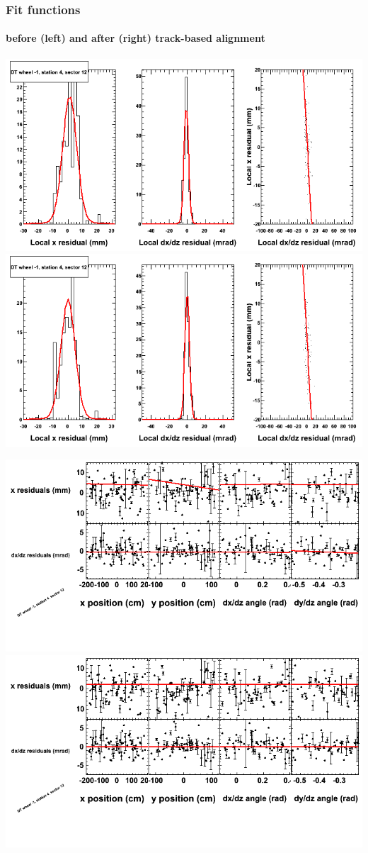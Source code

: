 \documentclass[compress]{beamer}
\begin{document}
\begin{frame}
\frametitle{Fit functions}
\framesubtitle{before (left) and after (right) track-based alignment}
\includegraphics[width=0.5\linewidth]{fitfunctions_re01/MBwhBst4sec12_bellcurves.png} \includegraphics[width=0.5\linewidth]{fitfunctions_re05/MBwhBst4sec12_bellcurves.png}

\includegraphics[width=0.5\linewidth]{fitfunctions_re01/MBwhBst4sec12_polynomials.png} \includegraphics[width=0.5\linewidth]{fitfunctions_re05/MBwhBst4sec12_polynomials.png}
\end{frame}
\end{document}
